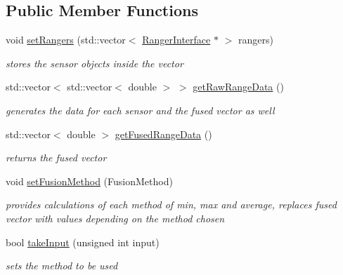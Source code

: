 \subsection*{Public Member Functions}
\begin{DoxyCompactItemize}
\item 
void \hyperlink{classRangerFusion_a01909c08b2a974e68b031056db730aba}{set\+Rangers} (std\+::vector$<$ \hyperlink{classRangerInterface}{Ranger\+Interface} $\ast$ $>$ rangers)\hypertarget{classRangerFusion_a01909c08b2a974e68b031056db730aba}{}\label{classRangerFusion_a01909c08b2a974e68b031056db730aba}

\begin{DoxyCompactList}\small\item\em stores the sensor objects inside the vector \end{DoxyCompactList}\item 
std\+::vector$<$ std\+::vector$<$ double $>$ $>$ \hyperlink{classRangerFusion_a5780383fdffe121a7a2372a047819ba9}{get\+Raw\+Range\+Data} ()\hypertarget{classRangerFusion_a5780383fdffe121a7a2372a047819ba9}{}\label{classRangerFusion_a5780383fdffe121a7a2372a047819ba9}

\begin{DoxyCompactList}\small\item\em generates the data for each sensor and the fused vector as well \end{DoxyCompactList}\item 
std\+::vector$<$ double $>$ \hyperlink{classRangerFusion_a2d68f0291653a422603ea9c8f2e33c21}{get\+Fused\+Range\+Data} ()\hypertarget{classRangerFusion_a2d68f0291653a422603ea9c8f2e33c21}{}\label{classRangerFusion_a2d68f0291653a422603ea9c8f2e33c21}

\begin{DoxyCompactList}\small\item\em returns the fused vector \end{DoxyCompactList}\item 
void \hyperlink{classRangerFusion_a1fc8c1b4a4e07225a2d51bc444ce049f}{set\+Fusion\+Method} (Fusion\+Method)\hypertarget{classRangerFusion_a1fc8c1b4a4e07225a2d51bc444ce049f}{}\label{classRangerFusion_a1fc8c1b4a4e07225a2d51bc444ce049f}

\begin{DoxyCompactList}\small\item\em provides calculations of each method of min, max and average, replaces fused vector with values depending on the method chosen \end{DoxyCompactList}\item 
bool \hyperlink{classRangerFusion_a49b3a2346c2d047274a3ad445a05b66f}{take\+Input} (unsigned int input)\hypertarget{classRangerFusion_a49b3a2346c2d047274a3ad445a05b66f}{}\label{classRangerFusion_a49b3a2346c2d047274a3ad445a05b66f}

\begin{DoxyCompactList}\small\item\em sets the method to be used \end{DoxyCompactList}\end{DoxyCompactItemize}


